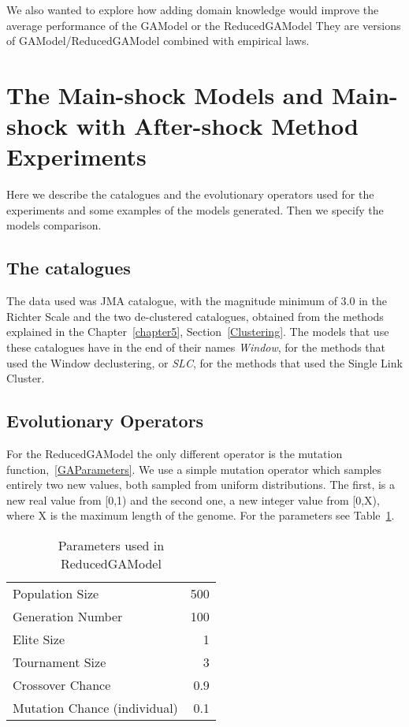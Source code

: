 We also wanted to explore how adding domain knowledge would improve the average performance of the GAModel or the ReducedGAModel They are versions of GAModel/ReducedGAModel combined with empirical laws.\\ 

\section{The Main-shock Models and Main-shock with After-shock Method Experiments}\label{bigExp}
 Here we describe the catalogues and the evolutionary operators used for the experiments and some examples of the models generated. Then we specify the models comparison.\\
 
\subsection{The catalogues}\label{catalogs}

The data used was JMA catalogue, with the magnitude minimum of 3.0 in the Richter Scale and the two de-clustered catalogues, obtained from the methods explained in the Chapter~\ref{chapter5}, Section~\ref{Clustering}. The models that use these catalogues have in the end of their names \textit{Window}, for the methods that used the Window declustering, or \textit{SLC}, for the methods that used the Single Link Cluster. \\ 

\subsection{Evolutionary Operators}

For the ReducedGAModel the only different operator is the mutation function,~\ref{GAParameters}. We use a simple mutation operator which samples entirely two new values, both sampled from uniform distributions. The first, is a new real value from [0,1) and the second one, a new integer value from [0,X), where X is the maximum length of the genome. For the parameters see Table~\ref{GAHParameters}.\\

\begin{table}[!ht]
	\caption{Parameters used in ReducedGAModel}
	\label{GAHParameters}
	\begin{center}
		\begin{tabular}{|l|r|}
			\hline
			Population Size & 500\\
			Generation Number & 100\\
			Elite Size & 1\\
			Tournament Size & 3\\
			Crossover Chance & 0.9\\
			Mutation Chance (individual) & 0.1\\
			\hline    
		\end{tabular}
	\end{center}
\end{table}

